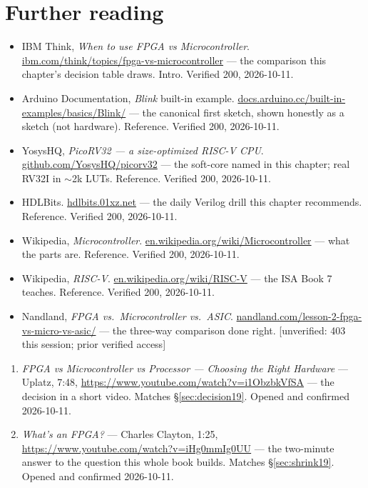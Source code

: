 \section*{Further reading}

\begin{itemize}
\item IBM Think, \emph{When to use FPGA vs
Microcontroller}.\newline
\url{ibm.com/think/topics/fpga-vs-microcontroller} --- the
comparison this chapter's decision table draws. Intro.
Verified 200, 2026-10-11.
\item Arduino Documentation, \emph{Blink} built-in
example.\newline
\url{docs.arduino.cc/built-in-examples/basics/Blink/} --- the
canonical first sketch, shown honestly as a sketch (not hardware).
Reference. Verified 200, 2026-10-11.
\item YosysHQ, \emph{PicoRV32 --- a size-optimized RISC-V
CPU}.\newline
\url{github.com/YosysHQ/picorv32} --- the soft-core named in this
chapter; real RV32I in $\sim$2k LUTs. Reference. Verified 200,
2026-10-11.
\item HDLBits.\newline
\url{hdlbits.01xz.net} --- the daily Verilog drill this chapter
recommends. Reference. Verified 200, 2026-10-11.
\item Wikipedia, \emph{Microcontroller}.\newline
\url{en.wikipedia.org/wiki/Microcontroller} --- what the parts
are. Reference. Verified 200, 2026-10-11.
\item Wikipedia, \emph{RISC-V}.\newline
\url{en.wikipedia.org/wiki/RISC-V} --- the ISA Book 7 teaches.
Reference. Verified 200, 2026-10-11.
\item Nandland, \emph{FPGA vs.\ Microcontroller vs.\
ASIC}.\newline
\url{nandland.com/lesson-2-fpga-vs-micro-vs-asic/} --- the
three-way comparison done right. [unverified: 403 this session;
prior verified access]
\end{itemize}

\begin{rulebox}
\begin{enumerate}
\item \emph{FPGA vs Microcontroller vs Processor --- Choosing the
Right Hardware} --- Uplatz, 7:48,
\url{https://www.youtube.com/watch?v=i1ObzbkVfSA} --- the decision
in a short video. Matches \S\ref{sec:decision19}.
Opened and confirmed 2026-10-11.
\item \emph{What's an FPGA?} --- Charles Clayton, 1:25,
\url{https://www.youtube.com/watch?v=iHg0mmIg0UU} --- the
two-minute answer to the question this whole book builds.
Matches \S\ref{sec:shrink19}. Opened and confirmed 2026-10-11.
\end{enumerate}
\end{rulebox}


